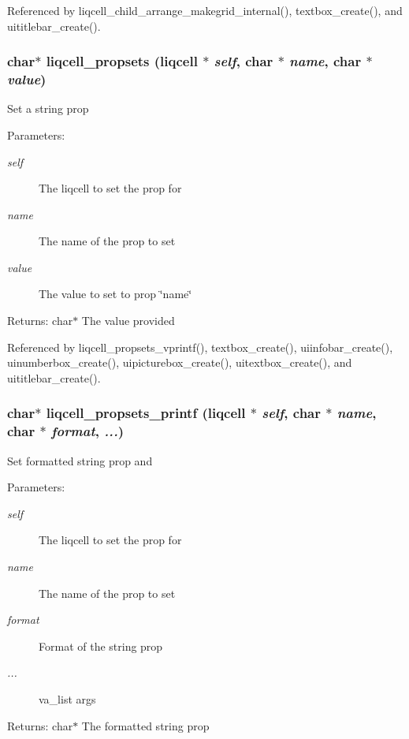 Referenced by liqcell\_\-child\_\-arrange\_\-makegrid\_\-internal(), textbox\_\-create(), and uititlebar\_\-create().
\subsubsection[{liqcell\_\-propsets}]{\setlength{\rightskip}{0pt plus 5cm}char$\ast$ liqcell\_\-propsets (liqcell $\ast$ {\em self}, \/  char $\ast$ {\em name}, \/  char $\ast$ {\em value})}\label{d7/db4/liqcell__prop_8c_0bc940f551da2fc15934dbb219afd405}


Set a string prop \begin{Desc}
\item[Parameters:]
\begin{description}
\item[{\em self}]The liqcell to set the prop for \item[{\em name}]The name of the prop to set \item[{\em value}]The value to set to prop \char`\"{}name\char`\"{} \end{description}
\end{Desc}
\begin{Desc}
\item[Returns:]char$\ast$ The value provided \end{Desc}


Referenced by liqcell\_\-propsets\_\-vprintf(), textbox\_\-create(), uiinfobar\_\-create(), uinumberbox\_\-create(), uipicturebox\_\-create(), uitextbox\_\-create(), and uititlebar\_\-create().
\subsubsection[{liqcell\_\-propsets\_\-printf}]{\setlength{\rightskip}{0pt plus 5cm}char$\ast$ liqcell\_\-propsets\_\-printf (liqcell $\ast$ {\em self}, \/  char $\ast$ {\em name}, \/  char $\ast$ {\em format}, \/   {\em ...})}\label{d7/db4/liqcell__prop_8c_fc25d6de82a049b5387947d89ef0f937}


Set formatted string prop and \begin{Desc}
\item[Parameters:]
\begin{description}
\item[{\em self}]The liqcell to set the prop for \item[{\em name}]The name of the prop to set \item[{\em format}]Format of the string prop \item[{\em ...}]va\_\-list args \end{description}
\end{Desc}
\begin{Desc}
\item[Returns:]char$\ast$ The formatted string prop \end{Desc}


